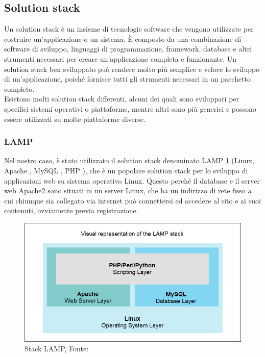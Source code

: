 \documentclass[a4paper,final,12pt]{report}
\begin{document}
\subsection{Solution stack}
Un solution stack è un insieme di tecnologie software che vengono utilizzate per costruire un'applicazione o un sistema. È composto da una combinazione di software di sviluppo, linguaggi di programmazione, framework, database e altri strumenti necessari per creare un'applicazione completa e funzionante.
Un solution stack ben sviluppato può rendere molto più semplice e veloce lo sviluppo di un'applicazione, poiché fornisce tutti gli strumenti necessari in un pacchetto completo.\\ 
Esistono molti solution stack differenti, alcuni dei quali sono sviluppati per specifici sistemi operativi o piattaforme, mentre altri sono più generici e possono essere utilizzati su molte piattaforme diverse.\\

\subsubsection{LAMP}
Nel nostro caso, è stato utilizzato il solution stack denominato LAMP \ref{figura:LAMPSTACK}\cite{LAMP} (Linux, Apache \cite{Apache}, MySQL \cite{MySQL}, PHP \cite{PHP}), che è un popolare solution stack per lo sviluppo di applicazioni web su sistema operativo Linux. Questo perché il database e il server web Apache2 sono situati in un server Linux, che ha un indirizzo di rete fisso a cui chiunque sia collegato via internet può connettersi ed accedere al sito e ai suoi contenuti, ovviamente previa registrazione.
\begin{figure}[hbtp]
\centering
\includegraphics[scale=0.47]{img_concettuale/LAMP.png}
\caption{Stack LAMP, Fonte: \cite{phoenixnap}}
\label{figura:LAMPSTACK}
\end{figure} 
\end{document}
